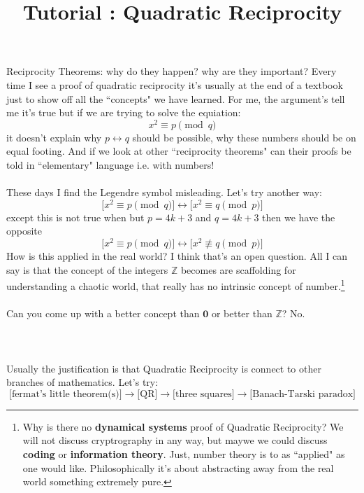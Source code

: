 \documentclass[12pt]{article}
\title{Tutorial : Quadratic Reciprocity}
\date{}
\begin{document}
\selectfont \fontsize{12.5}{15}\selectfont

\maketitle

\noindent Reciprocity Theorems: why do they happen?  why are they important?  Every time I see a proof of quadratic reciprocity it's usually at the end of a textbook just to show off all the ``concepts" we have learned.  For me, the argument's tell me it's true but if we are trying to solve the equiation:
$$ x^2 \equiv p \pmod q $$
it doesn't explain why $p \leftrightarrow q$ should be possible, why these numbers should be on equal footing.  And if we look at other ``reciprocity theorems"  can their proofs be told in ``elementary" language i.e. with numbers! \\ \\
These days I find the Legendre symbol misleading.  Let's try another way:
$$ \Big[ x^2 \equiv p \pmod q \Big] \leftrightarrow \Big[ x^2 \equiv q \pmod p \Big]  $$
except this is not true when but $p = 4k+3$ and $q = 4k + 3$ then we have the opposite
$$ \Big[ x^2 \equiv p \pmod q \Big] \leftrightarrow \Big[ x^2 \not\equiv q \pmod p \Big]  $$
How is this applied in the real world?  I think that's an open question.  All I can say is that the concept of the integers $\mathbb{Z}$ becomes are scaffolding for understanding a chaotic world, that really has no intrinsic concept of number.\footnote{Why is there no \textbf{dynamical systems}  proof of Quadratic Reciprocity?  We will not discuss {\color{black!10!white}cryptrography} in any way, but maywe we could discuss \textbf{coding}  or \textbf{information theory}.  Just, number theory is to as ``applied" as one would like.  Philosophically it's about abstracting away from the real world something extremely pure.} \\ \\
Can you come up with a better concept than $\mathbf{0}$ or better than $\mathbb{Z}$?  No. \\ \\ \\ \\
Usually the justification is that Quadratic Reciprocity is connect to other branches of mathematics.  Let's try:
$$ \big[ \text{fermat's little theorem(s)} \big]
\to \big[ \text{QR} \big]
\to \big[ \text{three squares} \big] 
\to \big[ \text{Banach-Tarski paradox} \big]$$


\newpage
\end{document}
